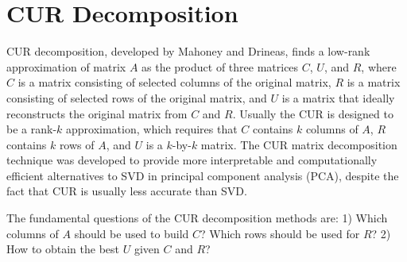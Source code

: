 \section{CUR Decomposition\label{Sec:DR:CUR}}
CUR decomposition, developed by Mahoney and Drineas\cite{MahoneyPNAS2009}, finds a low-rank approximation of matrix $A$ as the product of three matrices $C$, $U$, and $R$, where $C$ is a matrix consisting of selected columns of the original matrix, $R$ is a matrix consisting of selected rows of the original matrix, and $U$ is a matrix that ideally reconstructs the original matrix from $C$ and $R$. Usually the CUR is designed to be a rank-$k$ approximation, which requires that $C$ contains $k$ columns of $A$, $R$ contains $k$ rows of $A$, and $U$ is a $k$-by-$k$ matrix. The CUR matrix decomposition technique was developed to provide more interpretable and computationally efficient alternatives to SVD in principal component analysis (PCA), despite the fact that CUR is usually less accurate than SVD.

The fundamental questions of the CUR decomposition methods are: 1) Which columns of $A$ should be used to build $C$? Which rows should be used for $R$? 2) How to obtain the best $U$ given $C$ and $R$? %